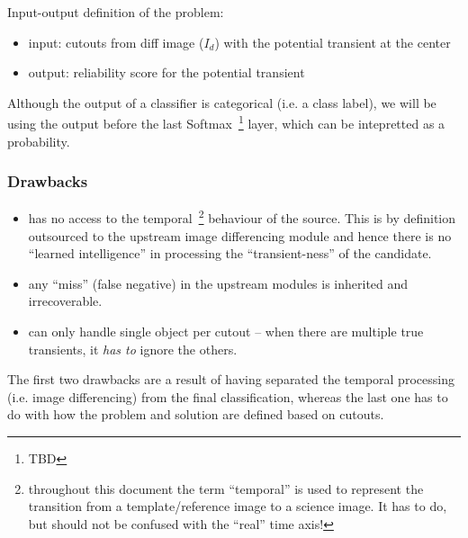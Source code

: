 Input-output definition of the problem:
\begin{itemize}
  \item input: cutouts from diff image ($I_d$) with the potential transient at the center
  \item output: reliability score for the potential transient
\end{itemize}

Although the output of a classifier is categorical (i.e. a class label), we will be using the output before the last Softmax~\footnote{TBD} layer, which can be intepretted as a probability.

\subsubsection{Drawbacks}
\begin{itemize}
\item has no access to the temporal~\footnote{throughout this document the term ``temporal'' is used to represent the transition from a template/reference image to a science image. It has to do, but should not be confused with the ``real'' time axis!} behaviour of the source. This is by definition outsourced to the upstream image differencing module and hence there is no ``learned intelligence'' in processing the ``transient-ness'' of the candidate.
\item any ``miss'' (false negative) in the upstream modules is inherited and irrecoverable.
\item can only handle single object per cutout -- when there are multiple true transients, it \emph{has to} ignore the others.
\end{itemize}

The first two drawbacks are a result of having separated the temporal processing (i.e. image differencing) from the final classification, whereas the last one has to do with how the problem and solution are defined based on cutouts.



